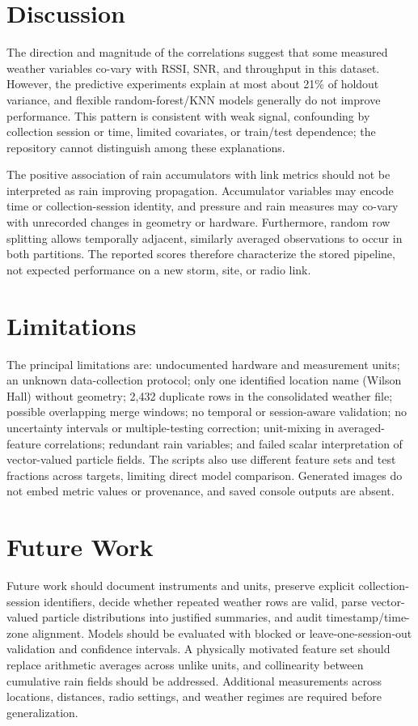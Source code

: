 \section{Discussion}
The direction and magnitude of the correlations suggest that some measured weather variables co-vary with RSSI, SNR, and throughput in this dataset. However, the predictive experiments explain at most about 21\% of holdout variance, and flexible random-forest/KNN models generally do not improve performance. This pattern is consistent with weak signal, confounding by collection session or time, limited covariates, or train/test dependence; the repository cannot distinguish among these explanations.

The positive association of rain accumulators with link metrics should not be interpreted as rain improving propagation. Accumulator variables may encode time or collection-session identity, and pressure and rain measures may co-vary with unrecorded changes in geometry or hardware. Furthermore, random row splitting allows temporally adjacent, similarly averaged observations to occur in both partitions. The reported scores therefore characterize the stored pipeline, not expected performance on a new storm, site, or radio link.

\section{Limitations}
The principal limitations are: undocumented hardware and measurement units; an unknown data-collection protocol; only one identified location name (Wilson Hall) without geometry; 2,432 duplicate rows in the consolidated weather file; possible overlapping merge windows; no temporal or session-aware validation; no uncertainty intervals or multiple-testing correction; unit-mixing in averaged-feature correlations; redundant rain variables; and failed scalar interpretation of vector-valued particle fields. The scripts also use different feature sets and test fractions across targets, limiting direct model comparison. Generated images do not embed metric values or provenance, and saved console outputs are absent.

\section{Future Work}
Future work should document instruments and units, preserve explicit collection-session identifiers, decide whether repeated weather rows are valid, parse vector-valued particle distributions into justified summaries, and audit timestamp/time-zone alignment. Models should be evaluated with blocked or leave-one-session-out validation and confidence intervals. A physically motivated feature set should replace arithmetic averages across unlike units, and collinearity between cumulative rain fields should be addressed. Additional measurements across locations, distances, radio settings, and weather regimes are required before generalization.
